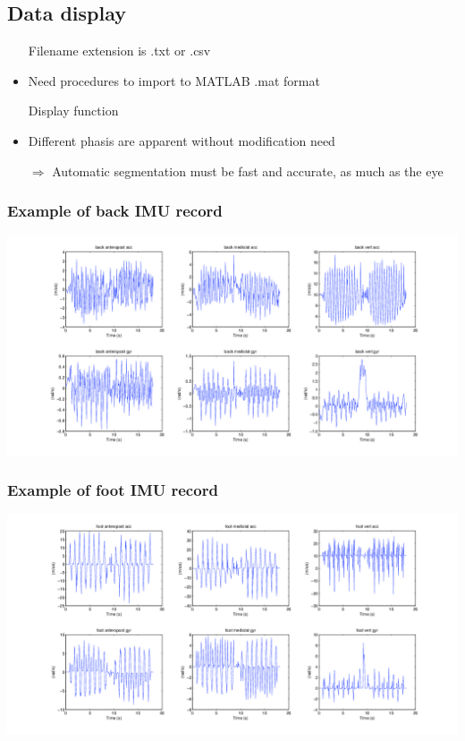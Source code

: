 \documentclass{beamer}
\begin{document}
\subsection{Data display}
\begin{frame}

\begin{itemize}

\item[Filename] extension is .txt or .csv
\item Need procedures to import to MATLAB .mat format

\item[Display] function
\item Different phasis are apparent without modification need

\item[$\Longrightarrow$] Automatic segmentation must be fast and accurate, as much as the eye

\end{itemize}

\end{frame}

\begin{frame}
\frametitle{Example of back IMU record}
\hspace*{-2.8cm}\includegraphics[scale=0.4]{examplevisuback}

\end{frame}

\begin{frame}
\frametitle{Example of foot IMU record}
\hspace*{-2.8cm}\includegraphics[scale=0.4]{examplevisufoot}

\end{frame}
\end{document}
